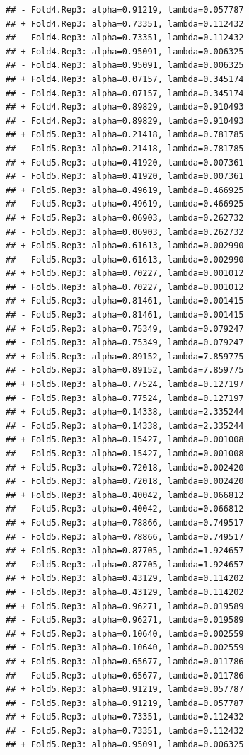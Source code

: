 \documentclass[
]{article}
\begin{document}
\begin{verbatim}
## - Fold4.Rep3: alpha=0.91219, lambda=0.057787 
## + Fold4.Rep3: alpha=0.73351, lambda=0.112432 
## - Fold4.Rep3: alpha=0.73351, lambda=0.112432 
## + Fold4.Rep3: alpha=0.95091, lambda=0.006325 
## - Fold4.Rep3: alpha=0.95091, lambda=0.006325 
## + Fold4.Rep3: alpha=0.07157, lambda=0.345174 
## - Fold4.Rep3: alpha=0.07157, lambda=0.345174 
## + Fold4.Rep3: alpha=0.89829, lambda=0.910493 
## - Fold4.Rep3: alpha=0.89829, lambda=0.910493 
## + Fold5.Rep3: alpha=0.21418, lambda=0.781785 
## - Fold5.Rep3: alpha=0.21418, lambda=0.781785 
## + Fold5.Rep3: alpha=0.41920, lambda=0.007361 
## - Fold5.Rep3: alpha=0.41920, lambda=0.007361 
## + Fold5.Rep3: alpha=0.49619, lambda=0.466925 
## - Fold5.Rep3: alpha=0.49619, lambda=0.466925 
## + Fold5.Rep3: alpha=0.06903, lambda=0.262732 
## - Fold5.Rep3: alpha=0.06903, lambda=0.262732 
## + Fold5.Rep3: alpha=0.61613, lambda=0.002990 
## - Fold5.Rep3: alpha=0.61613, lambda=0.002990 
## + Fold5.Rep3: alpha=0.70227, lambda=0.001012 
## - Fold5.Rep3: alpha=0.70227, lambda=0.001012 
## + Fold5.Rep3: alpha=0.81461, lambda=0.001415 
## - Fold5.Rep3: alpha=0.81461, lambda=0.001415 
## + Fold5.Rep3: alpha=0.75349, lambda=0.079247 
## - Fold5.Rep3: alpha=0.75349, lambda=0.079247 
## + Fold5.Rep3: alpha=0.89152, lambda=7.859775 
## - Fold5.Rep3: alpha=0.89152, lambda=7.859775 
## + Fold5.Rep3: alpha=0.77524, lambda=0.127197 
## - Fold5.Rep3: alpha=0.77524, lambda=0.127197 
## + Fold5.Rep3: alpha=0.14338, lambda=2.335244 
## - Fold5.Rep3: alpha=0.14338, lambda=2.335244 
## + Fold5.Rep3: alpha=0.15427, lambda=0.001008 
## - Fold5.Rep3: alpha=0.15427, lambda=0.001008 
## + Fold5.Rep3: alpha=0.72018, lambda=0.002420 
## - Fold5.Rep3: alpha=0.72018, lambda=0.002420 
## + Fold5.Rep3: alpha=0.40042, lambda=0.066812 
## - Fold5.Rep3: alpha=0.40042, lambda=0.066812 
## + Fold5.Rep3: alpha=0.78866, lambda=0.749517 
## - Fold5.Rep3: alpha=0.78866, lambda=0.749517 
## + Fold5.Rep3: alpha=0.87705, lambda=1.924657 
## - Fold5.Rep3: alpha=0.87705, lambda=1.924657 
## + Fold5.Rep3: alpha=0.43129, lambda=0.114202 
## - Fold5.Rep3: alpha=0.43129, lambda=0.114202 
## + Fold5.Rep3: alpha=0.96271, lambda=0.019589 
## - Fold5.Rep3: alpha=0.96271, lambda=0.019589 
## + Fold5.Rep3: alpha=0.10640, lambda=0.002559 
## - Fold5.Rep3: alpha=0.10640, lambda=0.002559 
## + Fold5.Rep3: alpha=0.65677, lambda=0.011786 
## - Fold5.Rep3: alpha=0.65677, lambda=0.011786 
## + Fold5.Rep3: alpha=0.91219, lambda=0.057787 
## - Fold5.Rep3: alpha=0.91219, lambda=0.057787 
## + Fold5.Rep3: alpha=0.73351, lambda=0.112432 
## - Fold5.Rep3: alpha=0.73351, lambda=0.112432 
## + Fold5.Rep3: alpha=0.95091, lambda=0.006325 

\end{verbatim}
\end{document}
